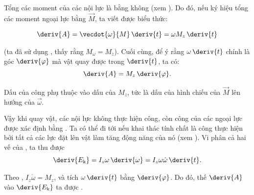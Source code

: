 \noindent
Tổng các moment của các nội lực là bằng không (xem ). Do đó, nếu ký hiệu tổng các moment ngoại lực bằng $\vec{M}$, ta viết được biểu thức:

\begin{equation}\label{eq:5_48}
	\deriv{A} = \vecdot{\omega}{M}\,\deriv{t} = \omega M_z\,\deriv{t}
\end{equation}

\noindent
(ta đã sử dụng , thấy rằng $M_{\omega} = M_z$). Cuối cùng, để ý rằng $\omega\,\deriv{t}$ chính là góc $\deriv{\varphi}$ mà vật quay được trong $\deriv{t}$, ta có:
\begin{equation}\label{eq:5_49}
	\deriv{A} = M_z\,\deriv{\varphi}.
\end{equation}

\noindent
Dấu của công phụ thuộc vào dấu của $M_z$, tức là dấu của hình chiếu của $\vec{M}$ lên hướng của $\vec{\omega}$.

Vậy khi quay vật, các nội lực không thực hiện công, còn công của các ngoại lực được xác định bằng . Ta có thể đi tới  nếu khai thác tính chất là công thực hiện bởi tất cả các lực đặt lên vật làm tăng động năng của nó (xem ). Vi phân cả hai vế của , ta thu được
\begin{equation*}
	\deriv{E_{\text{k}}} = I_z\omega\,\deriv{\omega} = I_z\omega\dot{\omega}\,\deriv{t}.
\end{equation*}

\noindent
Theo , $I_z\dot{\omega}=M_z$, và tích $\omega\,\deriv{t}$ bằng $\deriv{\varphi}$. Do đó, thế $\deriv{A}$ vào $\deriv{E_{\text{k}}}$ ta được .

